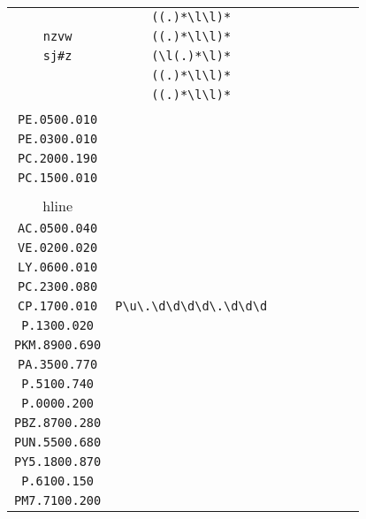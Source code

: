 \begin{longtable}{cccccccc}
\begin{tabular}{ll}
    \verb|| & \verb|((.)*\l\l)*|\\
\verb|nzvw| & \verb|((.)*\l\l)*|\\
\verb|sj#z| & \verb|(\l(.)*\l)*|\\
\verb|| & \verb|((.)*\l\l)*|\\
\verb|| & \verb|((.)*\l\l)*|
\end{tabular}
\\\midrule 
\begin{tabular}{l}
    \verb|PC.2300.040|\\
\verb|PE.0500.010|\\
\verb|PE.0300.010|\\
\verb|PC.2000.190|\\
\verb|PC.1500.010|\\
\\hline\\
\verb|AC.0500.040|\\
\verb|VE.0200.020|\\
\verb|LY.0600.010|\\
\verb|PC.2300.080|\\
\verb|CP.1700.010|
\end{tabular}

&
\verb|P\u\.\d\d\d\d\.\d\d\d|
&

\begin{tabular}{l}
    \verb|P(\u)*(\d)*\.\d\d00\.\d\d0|\\
\verb|P.1300.020|\\
\verb|PKM.8900.690|\\
\verb|PA.3500.770|\\
\verb|P.5100.740|\\
\verb|P.0000.200|
\end{tabular}

&

\begin{tabular}{l}
    \verb|P(\u)*(\d)*\.\d\d00\.\d\d0|\\
\verb|PBZ.8700.280|\\
\verb|PUN.5500.680|\\
\verb|PY5.1800.870|\\
\verb|P.6100.150|\\
\verb|PM7.7100.200|
\end{tabular}

&


\end{longtable}

